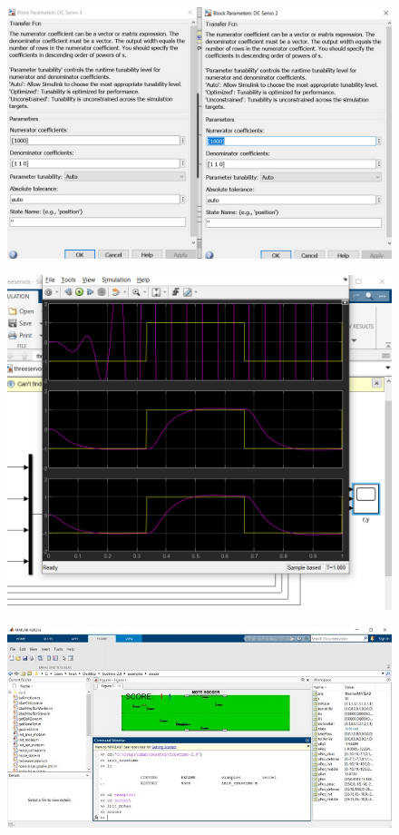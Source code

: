 \begin{figure}[H]
	\centering
	\includegraphics{9.jpg}
	\label{fig:label4}
\end{figure}

\begin{figure}[H]
	\centering
	\includegraphics{10.jpg}
	\label{fig:label4}
\end{figure}

\begin{figure}[H]
	\centering
	\includegraphics{11.jpg}
	\label{fig:label4}
\end{figure}

